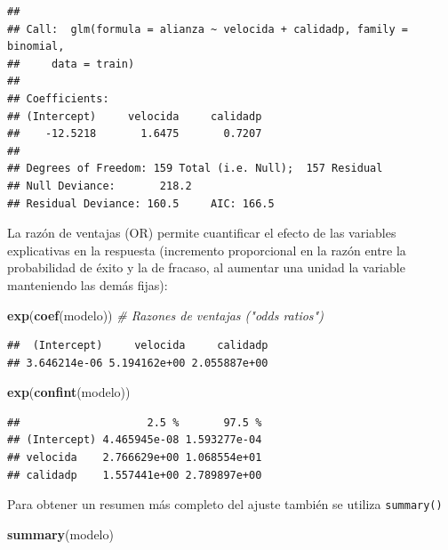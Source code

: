\documentclass[
]{book}
\newenvironment{Shaded}{\begin{snugshade}}{\end{snugshade}}
\newcommand{\CommentTok}[1]{\textcolor[rgb]{0.56,0.35,0.01}{\textit{#1}}}
\newcommand{\KeywordTok}[1]{\textcolor[rgb]{0.13,0.29,0.53}{\textbf{#1}}}
\newcommand{\NormalTok}[1]{#1}
\theoremstyle{break}
\theoremstyle{definition}
\theoremstyle{definition}
\theoremstyle{definition}
\theoremstyle{remark}
\begin{document}
\begin{verbatim}
## 
## Call:  glm(formula = alianza ~ velocida + calidadp, family = binomial, 
##     data = train)
## 
## Coefficients:
## (Intercept)     velocida     calidadp  
##    -12.5218       1.6475       0.7207  
## 
## Degrees of Freedom: 159 Total (i.e. Null);  157 Residual
## Null Deviance:       218.2 
## Residual Deviance: 160.5     AIC: 166.5
\end{verbatim}

La razón de ventajas (OR) permite cuantificar el efecto de las variables explicativas en la respuesta (incremento proporcional en la razón entre la probabilidad de éxito y la de fracaso, al aumentar una unidad la variable manteniendo las demás fijas):

\begin{Shaded}
\begin{Highlighting}[]
\KeywordTok{exp}\NormalTok{(}\KeywordTok{coef}\NormalTok{(modelo))  }\CommentTok{# Razones de ventajas ("odds ratios")}
\end{Highlighting}
\end{Shaded}

\begin{verbatim}
##  (Intercept)     velocida     calidadp 
## 3.646214e-06 5.194162e+00 2.055887e+00
\end{verbatim}

\begin{Shaded}
\begin{Highlighting}[]
\KeywordTok{exp}\NormalTok{(}\KeywordTok{confint}\NormalTok{(modelo))}
\end{Highlighting}
\end{Shaded}

\begin{verbatim}
##                    2.5 %       97.5 %
## (Intercept) 4.465945e-08 1.593277e-04
## velocida    2.766629e+00 1.068554e+01
## calidadp    1.557441e+00 2.789897e+00
\end{verbatim}

Para obtener un resumen más completo del ajuste también se utiliza \texttt{summary()}

\begin{Shaded}
\begin{Highlighting}[]
\KeywordTok{summary}\NormalTok{(modelo)}
\end{Highlighting}
\end{Shaded}
\end{document}
